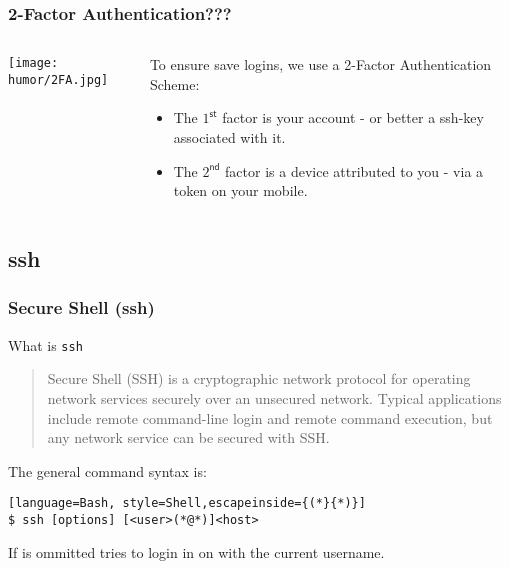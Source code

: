 \begin{frame}
	\frametitle{2-Factor Authentication???}
	\begin{columns}
		\begin{column}{0.6\textwidth}
			\texttt{[image: humor/2FA.jpg]}
		\end{column}
		\begin{column}{0.4\textwidth}
			To ensure save logins, we use a 2-Factor Authentication Scheme:
			\begin{itemize}[<+->]
				\item The $1^\mathsf{st}$ factor is your account - or better a ssh-key associated with it.
				\item The $2^\mathsf{nd}$ factor is a device attributed to you - via a token on your mobile.
			\end{itemize}
			
		\end{column}
	\end{columns}
	
\end{frame}

\subsection{ssh}

\begin{frame}[fragile]
	\frametitle{Secure Shell (ssh)}
	\vspace{-1em}
	\begin{block}{What is \texttt{ssh}}
		\begin{quote}
			Secure Shell (SSH) is a cryptographic network protocol for operating network services securely over an unsecured network.
			Typical applications include remote command-line login and remote command execution, but any network service can be secured with SSH.
		\end{quote}
	\end{block}
	\pause
	The general command syntax is:
	\begin{lstlisting}[language=Bash, style=Shell,escapeinside={(*}{*)}]
$ ssh [options] [<user>(*@*)]<host>
	\end{lstlisting}
	\vspace{-1em}
	\begin{hint}
		If  is ommitted  tries to login in on  with the current username.
	\end{hint}
\end{frame}

